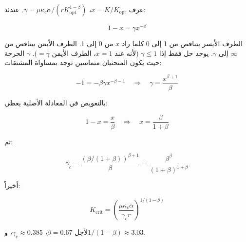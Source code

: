\documentclass[11pt,a4paper]{article}
\newcommand{\kappac}{\kappa_c}
\begin{document}
	عرف \(x = K/K_{\text{opt}}\)، \(\gamma = \mu \kappac \alpha / (r K_{\text{opt}}^{1-\beta})\). عندئذ:
	
	\begin{equation}
		1 - x = \gamma x^{-\beta}
		\label{eq:x-eqn}
	\end{equation}
	
	الطرف الأيسر يتناقص من 1 إلى 0 كلما زاد \(x\) من 0 إلى 1. الطرف الأيمن يتناقص من \(\infty\) إلى \(\gamma\). يوجد حل فقط إذا \(\gamma \leq 1\) (لأنه عند \(x=1\)، الطرف الأيمن \(=\gamma\)). \(\gamma\) الحرجة حيث يكون المنحنيان متماسين توجد بمساواة المشتقات:
	
	\begin{equation}
		-1 = -\beta \gamma x^{-\beta-1} \quad \Rightarrow \quad \gamma = \frac{x^{\beta+1}}{\beta}
		\label{eq:derivative}
	\end{equation}
	
	بالتعويض في المعادلة الأصلية يعطي:
	
	\begin{equation}
		1 - x = \frac{x}{\beta} \quad \Rightarrow \quad x = \frac{\beta}{1+\beta}
		\label{eq:x-crit}
	\end{equation}
	
	ثم:
	
	\begin{equation}
		\gamma_c = \frac{(\beta/(1+\beta))^{\beta+1}}{\beta} = \frac{\beta^{\beta}}{(1+\beta)^{1+\beta}}
		\label{eq:gamma-c-app}
	\end{equation}
	
	أخيراً:
	
	\begin{equation}
		K_{\text{crit}} = \left( \frac{\mu \kappac \alpha}{\gamma_c r} \right)^{1/(1-\beta)}
		\label{eq:Kcrit-app}
	\end{equation}
	
	لأجل \(\beta = 0.67\)، \(\gamma_c \approx 0.385\)، و\(1/(1-\beta) \approx 3.03\).
	
\end{document}
